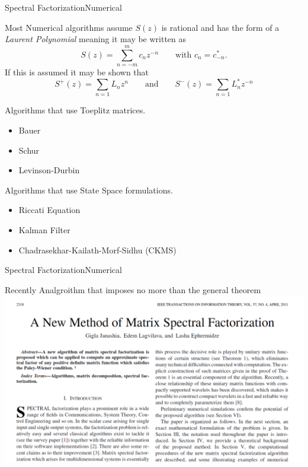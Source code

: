 \documentclass{beamer}  %
\renewcommand{\and}{\qquad \text{and}\qquad}
\begin{document}
\begin{frame}{Spectral Factorization}{Numerical}
	
	Most Numerical algorithms assume $S(z)$ is rational and has the form of a \emph{Laurent Polynomial} meaning it may be written as $$S(z) = \sum_{n=-m}^m c_nz^{-n}\qquad \text{with }c_n = c_{-n}^*.$$
	If this is assumed it may be shown that 
	$$S^+(z) = \sum_{n=1} L_n z^{n} \and S^-(z) = \sum_{n=1} L_n^* z^{-n}$$

	Algorithms that use Toeplitz matrices.
	\begin{itemize}
		\item Bauer
		\item Schur
		\item Levinson-Durbin
	\end{itemize}
	Algorithms that use State Space formulations.
	\begin{itemize}
		\item Riccati Equation
		\item Kalman Filter
		\item Chadrasekhar-Kailath-Morf-Sidhu (CKMS)
	\end{itemize}
\end{frame}


\begin{frame}{Spectral Factorization}{Numerical}
	
	Recently Analgroithm that imposes no more than the general theorem
	\includegraphics[scale=.35]{fig/ANewMethod.png}
\end{frame}




\end{document}

